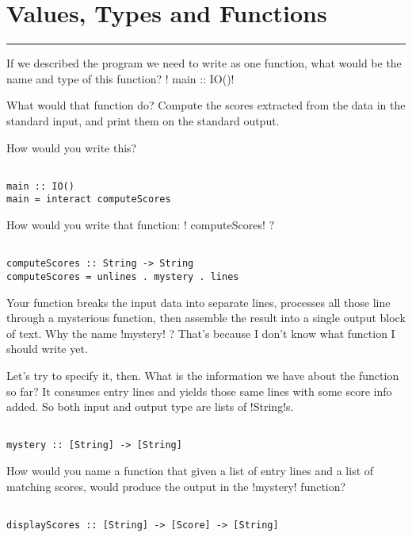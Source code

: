 
 \newpage
\section{Values, Types and Functions} 
\vspace{10cm}
\hrule

\lhQ If we described the program we need to write as one function, what would be the name and type of this function? 
\lhA \il! main :: IO()!

\lhN What would that function do?
\lhA Compute the scores extracted from the data in the standard input, and print them on the standard output.

\lhN How would you write this?
\lhA \begin{lstlisting}[] 

main :: IO()
main = interact computeScores

\end{lstlisting}

\lhN How would you write that function: \il! computeScores! ?
\lhA \begin{lstlisting}[] 

computeScores :: String -> String
computeScores = unlines . mystery . lines

\end{lstlisting}

\lhN Your function breaks the input data into separate lines, processes all those line through a mysterious function, then assemble the result into a single output block of text. Why the name \il!mystery! ?  
\lhA That's because I don't know what function I should write yet.

\lhN Let's try to specify it, then. What is the information we have about the function so far?
\lhA It consumes entry lines and yields those same lines with some score info added. So both input and output type are lists of \il!String!s. 
\begin{lstlisting}[] 

mystery :: [String] -> [String]

\end{lstlisting}

\lhN How would you name a function that given a list of entry lines and a list of matching scores, would produce the output in the \il!mystery! function?
\lhA 
\begin{lstlisting}[] 

displayScores :: [String] -> [Score] -> [String]

\end{lstlisting}

